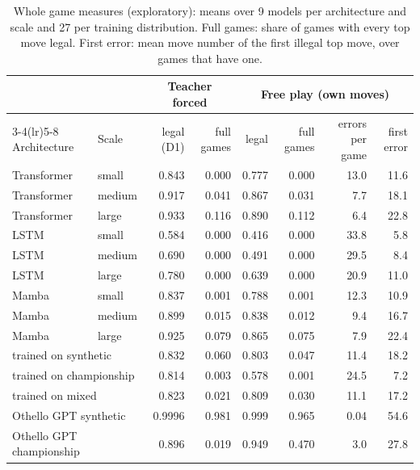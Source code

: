 \documentclass[journal]{IEEEtran}
\begin{document}
\begin{table}[t]
    \centering
    \caption{Whole game measures (exploratory): means over 9 models per architecture and scale and 27 per training
    distribution. Full games: share of games with every top move legal. First error: mean move number of the first
    illegal top move, over games that have one.}
    \label{tab:sequence}
    \footnotesize
    \begin{tabular}{llrrrrrr}
    \toprule
    & & \multicolumn{2}{c}{Teacher forced} & \multicolumn{4}{c}{Free play (own moves)} \\
    \cmidrule(lr){3-4}\cmidrule(lr){5-8}
    Architecture & Scale & legal (D1) & full games & legal & full games & errors per game & first error \\
    \midrule
    Transformer & small  & 0.843 & 0.000 & 0.777 & 0.000 & 13.0 & 11.6 \\
    Transformer & medium & 0.917 & 0.041 & 0.867 & 0.031 &  7.7 & 18.1 \\
    Transformer & large  & 0.933 & 0.116 & 0.890 & 0.112 &  6.4 & 22.8 \\
    LSTM        & small  & 0.584 & 0.000 & 0.416 & 0.000 & 33.8 &  5.8 \\
    LSTM        & medium & 0.690 & 0.000 & 0.491 & 0.000 & 29.5 &  8.4 \\
    LSTM        & large  & 0.780 & 0.000 & 0.639 & 0.000 & 20.9 & 11.0 \\
    Mamba       & small  & 0.837 & 0.001 & 0.788 & 0.001 & 12.3 & 10.9 \\
    Mamba       & medium & 0.899 & 0.015 & 0.838 & 0.012 &  9.4 & 16.7 \\
    Mamba       & large  & 0.925 & 0.079 & 0.865 & 0.075 &  7.9 & 22.4 \\
    \midrule
    \multicolumn{2}{l}{trained on synthetic}    & 0.832 & 0.060 & 0.803 & 0.047 & 11.4 & 18.2 \\
    \multicolumn{2}{l}{trained on championship} & 0.814 & 0.003 & 0.578 & 0.001 & 24.5 &  7.2 \\
    \multicolumn{2}{l}{trained on mixed}        & 0.823 & 0.021 & 0.809 & 0.030 & 11.1 & 17.2 \\
    \midrule
    \multicolumn{2}{l}{Othello GPT synthetic}    & 0.9996 & 0.981 & 0.999 & 0.965 & 0.04 & 54.6 \\
    \multicolumn{2}{l}{Othello GPT championship} & 0.896 & 0.019 & 0.949 & 0.470 & 3.0 & 27.8 \\
    \bottomrule
    \end{tabular}
\end{table}
\end{document}
